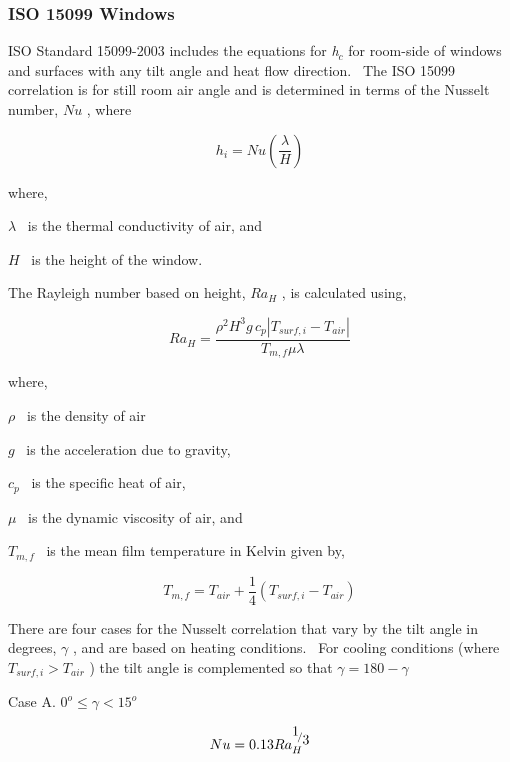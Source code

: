 \subsubsection{ISO 15099 Windows}\label{iso-15099-windows}

ISO Standard 15099-2003 includes the equations for \emph{h\(_{c}\)} for room-side of windows and surfaces with any tilt angle and heat flow direction.~ The ISO 15099 correlation is for still room air angle and is determined in terms of the Nusselt number, \(Nu\) , where

\begin{equation}
{h_i} = Nu\left( {\frac{\lambda }{H}} \right)
\end{equation}

where,

\(\lambda\) ~is the thermal conductivity of air, and

\(H\) ~is the height of the window.

The Rayleigh number based on height, \(R{a_H}\) , is calculated using,

\begin{equation}
R{a_H} = \frac{{{\rho ^2}{H^3}g\,{c_p}\left| {{T_{surf,i}} - {T_{air}}} \right|}}{{{T_{m,f}}\mu \lambda }}
\end{equation}

where,

\(\rho\) ~is the density of air

\(g\) ~is the acceleration due to gravity,

\({c_p}\) ~is the specific heat of air,

\(\mu\) ~is the dynamic viscosity of air, and

\({T_{m,f}}\) ~is the mean film temperature in Kelvin given by,

\begin{equation}
{T_{m,f}} = {T_{air}} + \frac{1}{4}\left( {{T_{surf,i}} - {T_{air}}} \right)
\end{equation}

There are four cases for the Nusselt correlation that vary by the tilt angle in degrees, \(\gamma\) , and are based on heating conditions.~ For cooling conditions (where \({T_{surf,i}} > {T_{air}}\) ) the tilt angle is complemented so that \(\gamma = 180 - \gamma\)

Case A. \({0^o } \leq \gamma < 15^o\)

\begin{equation}
Nu = 0.13Ra_H^{{\raise0.7ex\hbox{1} \!\mathord{\left/ {\vphantom {1 3}}\right.}\!\lower0.7ex\hbox{3}}}
\end{equation}

